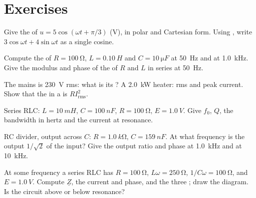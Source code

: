 \section{Exercises}

\begin{exercise}[$\star$]\label{exo:b1:sinusoidal-impedance:1}
Give the  of $u = 5\cos(\omega t + \pi/3)$ (V), in
polar and Cartesian form. Using , write $3\cos\omega t
+ 4\sin\omega t$ as a single cosine.
\end{exercise}

\begin{exercise}[$\star$]\label{exo:b1:sinusoidal-impedance:2}
Compute the  of $R = \qty{100}{\ohm}$, $L = \qty{0.10}{H}$ and
$C = \qty{10}{\micro F}$ at \qty{50}{Hz} and at \qty{1.0}{kHz}. Give the
modulus and phase of the  of $R$ and $L$ in series at
\qty{50}{Hz}.
\end{exercise}

\begin{exercise}[$\star$]\label{exo:b1:sinusoidal-impedance:3}
The mains is \qty{230}{V} rms: what is its ? A \qty{2.0}{kW}
heater: rms and peak current. Show that the  in a 
is $RI_{\mathrm{rms}}^2$.
\end{exercise}

\begin{exercise}[$\star$]\label{exo:b1:sinusoidal-impedance:4}
Series RLC: $L = \qty{10}{mH}$, $C = \qty{100}{nF}$, $R = \qty{100}{\ohm}$,
$E = \qty{1.0}{V}$. Give $f_0$, $Q$, the bandwidth in hertz and the
current  at resonance.
\end{exercise}

\begin{exercise}[$\star\star$]\label{exo:b1:sinusoidal-impedance:5}
RC divider, output across $C$: $R = \qty{1.0}{k\ohm}$, $C = \qty{159}{nF}$.
At what frequency is the output $1/\sqrt2$ of the input? Give the
output  ratio and phase at \qty{1.0}{kHz} and at \qty{10}{kHz}.
\end{exercise}

\begin{exercise}[$\star\star$]\label{exo:b1:sinusoidal-impedance:6}
At some frequency a series RLC has $R = \qty{100}{\ohm}$, $L\omega =
\qty{250}{\ohm}$, $1/C\omega = \qty{100}{\ohm}$, and $E = \qty{1.0}{V}$.
Compute $\underline Z$, the current  and phase, and the three
 ; draw the  diagram. Is the circuit above or
below resonance?
\end{exercise}

